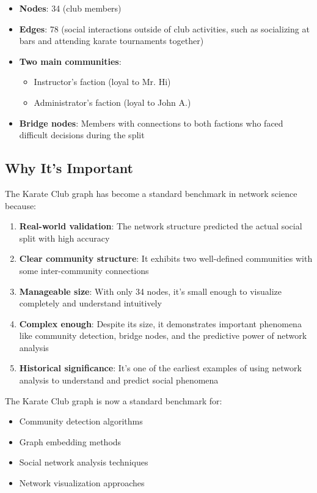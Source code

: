 \begin{notechapter}
\begin{itemize}
    \item \textbf{Nodes}: 34 (club members)
    \item \textbf{Edges}: 78 (social interactions outside of club activities, such as socializing at bars and attending karate tournaments together)
    \item \textbf{Two main communities}: 
    \begin{itemize}
        \item Instructor's faction (loyal to Mr. Hi)
        \item Administrator's faction (loyal to John A.)
    \end{itemize}
    \item \textbf{Bridge nodes}: Members with connections to both factions who faced difficult decisions during the split
\end{itemize}

\subsection{Why It's Important}

The Karate Club graph has become a standard benchmark in network science because:

\begin{enumerate}
    \item \textbf{Real-world validation}: The network structure predicted the actual social split with high accuracy
    \item \textbf{Clear community structure}: It exhibits two well-defined communities with some inter-community connections
    \item \textbf{Manageable size}: With only 34 nodes, it's small enough to visualize completely and understand intuitively
    \item \textbf{Complex enough}: Despite its size, it demonstrates important phenomena like community detection, bridge nodes, and the predictive power of network analysis
    \item \textbf{Historical significance}: It's one of the earliest examples of using network analysis to understand and predict social phenomena
\end{enumerate}

The Karate Club graph is now a standard benchmark for:
\begin{itemize}
    \item Community detection algorithms
    \item Graph embedding methods
    \item Social network analysis techniques
    \item Network visualization approaches
\end{itemize}


\end{notechapter}
